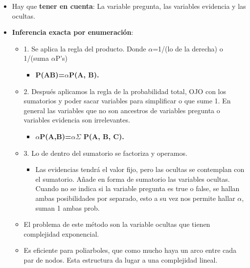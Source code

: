 \documentclass[12pt, twoside, openright]{report} %
\begin{document}
  \begin{itemize}
  \item Hay que \textbf{tener en cuenta}: La variable pregunta, las
    variables evidencia y las ocultas.
    \pagebreak
  \item \textbf{Inferencia exacta por enumeración}:
    

    \begin{itemize}
    \item 1. Se aplica la regla del producto. Donde $\alpha$=1/(lo de la derecha) o
      1/(suma $\alpha$P's)
      

      \begin{itemize}
      \item \textbf{P(A\textbar B)=$\alpha$P(A, B).}
        
      \end{itemize}
    \item 2. Después aplicamos la regla de la probabilidad total, OJO con
      los sumatorios y poder sacar variables para simplificar o que sume
      1. En general las variables que no son ancestros de variables
      pregunta o variables evidencia son irrelevantes.
      

      \begin{itemize}
      \item \textbf{$\alpha$P(A,B)=$\alpha$$\Sigma$ P(A, B, C).}
        
      \end{itemize}
    \item 3. Lo de dentro del sumatorio se factoriza y operamos.
      

      \begin{itemize}
      \item Las evidencias tendrá el valor fijo, pero las ocultas se
        contemplan con el sumatorio. Añade en forma de sumatorio las
        variables ocultas. Cuando no se indica si la variable pregunta
        es true o false, se hallan ambas posibilidades por separado,
        esto a su vez nos permite hallar $\alpha$, suman 1 ambas prob.
        
      \end{itemize}
    \item El problema de este método son la variable ocultas que tienen
      complejidad exponencial.
      
    \item Es eficiente para poliarboles, que como mucho haya un arco entre
      cada par de nodos. Esta estructura da lugar a una complejidad
      lineal.
      

\end{itemize}
\end{itemize}
\end{document}
